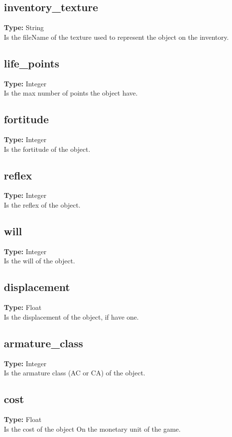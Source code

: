 \documentclass[letterpaper,12pt]{article}
\begin{document}
\subsection{inventory\_texture}
{\bf Type:} String\\
Is the fileName of the texture used to represent the object on the inventory.

\subsection{life\_points}
{\bf Type:} Integer\\
Is the max number of points the object have.

\subsection{fortitude}
{\bf Type:} Integer\\
Is the fortitude of the object.

\subsection{reflex}
{\bf Type:} Integer\\
Is the reflex of the object.

\subsection{will}
{\bf Type:} Integer\\
Is the will of the object.

\subsection{displacement}
{\bf Type:} Float\\
Is the displacement of the object, if have one.

\subsection{armature\_class}
{\bf Type:} Integer\\
Is the armature class (AC or CA) of the object.

\subsection{cost}
{\bf Type:} Float\\
Is the cost of the object On the monetary unit of the game.
\end{document}
